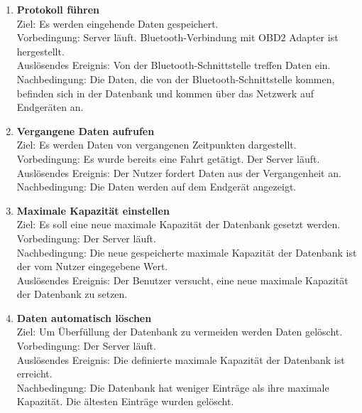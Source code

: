 \documentclass[pflichtenheft.tex]{subfiles}
\begin{document}
	\begin{enumerate}
		\setcounter{enumi}{\value{enumTemp}}
		\item{\textbf{Protokoll führen}} \\ Ziel: Es werden eingehende Daten gespeichert. \\ Vorbedingung: Server läuft. Bluetooth-Verbindung mit OBD2 Adapter ist hergestellt. \\ Auslösendes Ereignis: Von der Bluetooth-Schnittstelle treffen Daten ein. %
		Nachbedingung: Die Daten, die von der Bluetooth-Schnittstelle kommen, befinden sich in der Datenbank und kommen über das Netzwerk auf Endgeräten an.
		
		\item{\textbf{Vergangene Daten aufrufen}} \\ Ziel: Es werden Daten von vergangenen Zeitpunkten dargestellt. \\ Vorbedingung: Es wurde bereits eine Fahrt getätigt. Der Server läuft.\\ Auslösendes Ereignis: Der Nutzer fordert Daten aus der Vergangenheit an. \\ Nachbedingung: Die Daten werden auf dem Endgerät angezeigt.
	
		\item{\textbf{Maximale Kapazität einstellen}} \\ Ziel: Es soll eine neue maximale Kapazität der Datenbank gesetzt werden. \\ Vorbedingung: Der Server läuft. \\Nachbedingung: Die neue gespeicherte maximale Kapazität der Datenbank ist der vom Nutzer eingegebene Wert. \\Auslösendes Ereignis: Der Benutzer versucht, eine neue maximale Kapazität der Datenbank zu setzen. 
		
		\item{\textbf{Daten automatisch löschen}} \\ Ziel: Um Überfüllung der Datenbank zu vermeiden werden Daten gelöscht. \\ Vorbedingung: Der Server läuft. \\ Auslösendes Ereignis: Die definierte maximale Kapazität der Datenbank ist erreicht. \\ Nachbedingung: Die Datenbank hat weniger Einträge als ihre maximale Kapazität. Die ältesten Einträge wurden gelöscht.

		\renewcommand{\theenumi}{/FA\ifnum \value{enumi}<10 0\fi\arabic{enumi}0W/}
		\renewcommand{\labelenumi}{\theenumi}
		\renewcommand{\theenumii}{\arabic{enumii}}
		\renewcommand{\labelenumii}{/FA\ifnum \value{enumi}<10 0\fi\arabic{enumi}\arabic{enumii}W/}


\end{enumerate}
\end{document}
